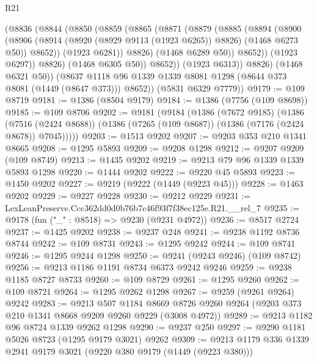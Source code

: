 \begin{lexlean}{R21}
\begin{coremodule}
                (@8836
                  (@8844
                    (@8850
                      (@8859
                        (@8865
                          (@8871
                            (@8879
                              (@8885
                                (@8894
                                  (@8900
                                    (@8906
                                      (@8914
                                        (@8920 (@8929 @9113 (@1923 @6265)) @8826)
                                        (@1468 @6273 @50))
                                      @8652))
                                  (@1923 @6281))
                                @8826)
                              (@1468 @6289 @50))
                            @8652))
                        (@1923 @6297))
                      @8826)
                    (@1468 @6305 @50))
                  @8652))
              (@1923 @6313))
            @8826)
          (@1468 @6321 @50))
        (@8637 @1118 @96 @1339 @1339 @8081 @1298 (@8644 @373 @8081 (@1449 (@8647 @373))) @8652))
      (@5831 @6329 @7779))
@9179 := @109 @8719
@9181 := @1386 (@8504 @9179)
@9184 := @1386 (@7756 (@109 @8698))
@9185 := @109 @8706
@9202 := @9181
    (@9184
      (@1386
        (@7672 @9185)
        (@1386
          (@7516 (@2424 @8688))
          (@1386 (@7265 (@109 @8687)) (@1386 (@7176 (@2424 @8678)) @7045)))))
@9203 := @1513 @9202
@9207 := @9203 @353 @210 @1341 @8665
@9208 := @1295 @5893
@9209 := @9208 @1298
@9212 := @9207 @9209 (@109 @8749)
@9213 := @1435 @9202
@9219 := @9213 @79 @96 @1339 @1339 @5893 @1298
@9220 := @1444 @9202
@9222 := @9220 @45 @5893
@9223 := @1450 @9202
@9227 := @9219 (@9222 (@1449 (@9223 @45)))
@9228 := @1463 @9202
@9229 := @9227 @9228
@9230 := @9212 @9229
@9231 := LexLeanPreserve.Ccc362dd0d0b76b7c46f93f7f38ec125e.R21.__rel_7
@9235 := @9178 (fun ("_" : @8518) => @9230 (@9231 @4972))
@9236 := @8517 @2724
@9237 := @1425 @9202
@9238 := @9237 @248
@9241 := @9238 @1192 @8736 @8744
@9242 := @109 @8731
@9243 := @1295 @9242
@9244 := @109 @8741
@9246 := @1295 @9244 @1298
@9250 := @9241 (@9243 @9246) (@109 @8742)
@9256 := @9213 @1186 @1191 @8734 @6373 @9242 @9246
@9259 := @9238 @1185 @8727 @8733
@9260 := @109 @8729
@9261 := @1295 @9260
@9262 := @109 @8721
@9264 := @1295 @9262 @1298
@9267 := @9259 (@9261 @9264) @9242
@9283 := @9213
    @507
    @1184
    @8669
    @8726
    @9260
    @9264
    (@9203 @373 @210 @1341 @8668 @9209 @9260 @9229 (@3008 @4972))
@9289 := @9213 @1182 @96 @8724 @1339 @9262 @1298
@9290 := @9237 @250
@9297 := @9290 @1181 @5026 @8723 (@1295 @9179 @3021) @9262
@9309 := @9213 @1179 @336 @1339 @2941 @9179 @3021 (@9220 @380 @9179 (@1449 (@9223 @380)))

\end{coremodule}
\end{lexlean}
